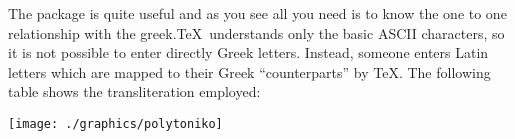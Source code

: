 \begin{multicols}{2}
The package is quite useful and as you see all you need is to know the
one to one relationship with the greek.\TeX\ understands only the basic ASCII characters, so it is not possible
to enter directly Greek letters. Instead, someone enters Latin letters
which are mapped to their Greek ``counterparts'' by \TeX. The following
table shows the transliteration employed:




  \texttt{[image: ./graphics/polytoniko]}
  \label{fig:polytoniko}



%




\end{multicols}
